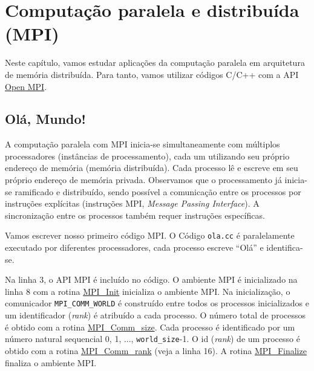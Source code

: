 

\chapter{Computação paralela e distribuída (MPI)}\label{cap_mpi}
\thispagestyle{fancy}

Neste capítulo, vamos estudar aplicações da computação paralela em arquitetura de memória distribuída. Para tanto, vamos utilizar códigos C/C++ com a API \href{https://www.open-mpi.org/}{Open MPI}.

\section{Olá, Mundo!}\label{cap_mpi_sec_ola}

A computação paralela com MPI inicia-se simultaneamente com múltiplos processadores (instâncias de processamento), cada um utilizando seu próprio endereço de memória (memória distribuída). Cada processo lê e escreve em seu próprio endereço de memória privada. Observamos que o processamento já inicia-se ramificado e distribuído, sendo possível a comunicação entre os processos por instruções explícitas (instruções MPI, {\it Message Passing Interface}). A sincronização entre os processos também requer instruções específicas.

Vamos escrever nosso primeiro código MPI. O Código \verb+ola.cc+ é paralelamente executado por diferentes processadores, cada processo escreve ``Olá'' e identifica-se.



Na linha 3, o API MPI é incluído no código. O ambiente MPI é inicializado na linha 8 com a rotina \href{https://www.open-mpi.org/doc/v4.1/man3/MPI\_Init.3.php}{MPI\_Init} inicializa o ambiente MPI. Na inicialização, o comunicador \verb+MPI_COMM_WORLD+ é construído entre todos os processos inicializados e um identificador ({\it rank}) é atribuído a cada processo. O número total de processos é obtido com a rotina \href{https://www.open-mpi.org/doc/v4.1/man3/MPI\_Comm\_size.3.php}{MPI\_Comm\_size}. Cada processo é identificado por um número natural sequencial 0, 1, ..., \verb+world_size+-1. O id ({\it rank}) de um processo é obtido com a rotina \href{https://www.open-mpi.org/doc/v4.1/man3/MPI\_Comm\_rank.3.php}{MPI\_Comm\_rank} (veja a linha 16). A rotina \href{https://www.open-mpi.org/doc/v4.1/man3/MPI\_Finalize.3.php}{MPI\_Finalize} finaliza o ambiente MPI.


